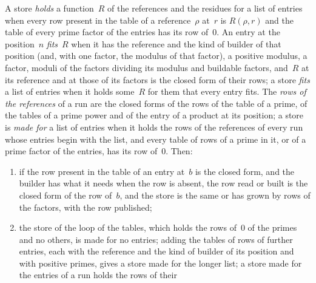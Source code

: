 \begin{lemma}\label{lem:runRows}
  \leanok
  A store \emph{holds} a function~$R$ of the references and the residues for a list of entries when
  every row present in the table of a reference~$\rho$ at~$r$ is $R(\rho, r)$ and the table of every
  prime factor of the entries has its row of~$0$. An entry at the position~$n$ \emph{fits}~$R$ when
  it has the reference and the kind of builder of that position (and, with one factor, the modulus
  of that factor), a positive modulus, a factor, moduli of the factors dividing its modulus and
  buildable factors, and~$R$ at its reference and at those of its factors is the closed form of
  their rows; a store \emph{fits} a list of entries when it holds some~$R$ for them that every entry
  fits. The \emph{rows of the references} of a run are the closed forms of the rows of the table of
  a prime, of the tables of a prime power and of the entry of a product at its position; a store is
  \emph{made for} a list of entries when it holds the rows of the references of every run whose
  entries begin with the list, and every table of rows of a prime in it, or of a prime factor of the
  entries, has its row of~$0$. Then:
  \begin{enumerate}
    \item if the row present in the table of an entry at~$b$ is the closed form, and the builder
      has what it needs when the row is absent, the row read or built is the closed form of the
      row of~$b$, and the store is the same or has grown by rows of the factors, with the row
      published;
    \item the store of the loop of the tables, which holds the rows of~$0$ of the primes and no
      others, is made for no entries; adding the tables of rows of further entries, each with the
      reference and the kind of builder of its position and with positive primes, gives a store
      made for the longer list; a store made for the entries of a run holds the rows of their

\end{enumerate}
\end{lemma}
